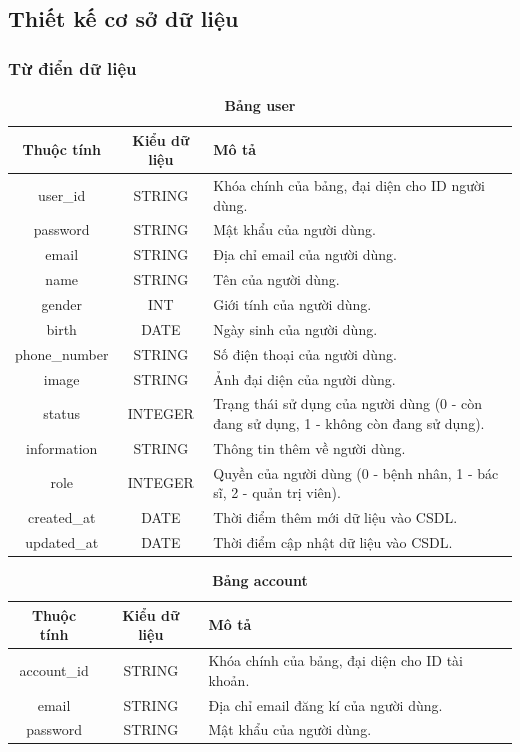 \subsection{Thiết kế cơ sở dữ liệu}
\label{design_database}

\subsubsection{Từ điển dữ liệu}

\begin{table}[H]
  \caption{\bfseries \fontsize{12pt}{0pt}\selectfont Bảng user}
  \centering
  \begin{tabularx}{0.9\textwidth}{|c|c|X|}
    \hline
    \textbf{Thuộc tính} & \textbf{Kiểu dữ liệu} & \textbf{Mô tả} \\
    \hline
    user\_id & STRING & Khóa chính của bảng, đại diện cho ID người dùng. \\
    \hline
    password & STRING & Mật khẩu của người dùng. \\
    \hline
    email & STRING & Địa chỉ email của người dùng. \\
    \hline
    name & STRING & Tên của người dùng. \\
    \hline
    gender & INT & Giới tính của người dùng. \\
    \hline
    birth & DATE & Ngày sinh của người dùng. \\
    \hline
    phone\_number & STRING & Số điện thoại của người dùng. \\
    \hline
    image & STRING & Ảnh đại diện của người dùng. \\
    \hline
    status & INTEGER & Trạng thái sử dụng của người dùng (0 - còn đang sử dụng, 1 - không còn đang sử dụng). \\
    \hline
    information & STRING & Thông tin thêm về người dùng. \\
    \hline
    role & INTEGER & Quyền của người dùng (0 - bệnh nhân, 1 - bác sĩ, 2 - quản trị viên). \\
    \hline
    created\_at & DATE & Thời điểm thêm mới dữ liệu vào CSDL. \\
    \hline
    updated\_at & DATE & Thời điểm cập nhật dữ liệu vào CSDL. \\
    \hline
    
  \end{tabularx}
\end{table}


\begin{table}[H]
  \caption{\bfseries \fontsize{12pt}{0pt}\selectfont Bảng account}
  \centering
  \begin{tabularx}{0.9\textwidth}{|c|c|X|}
    \hline
    \textbf{Thuộc tính} & \textbf{Kiểu dữ liệu} & \textbf{Mô tả} \\
    \hline
    account\_id & STRING & Khóa chính của bảng, đại diện cho ID tài khoản. \\
    \hline
    email & STRING & Địa chỉ email đăng kí của người dùng. \\
    \hline
    password & STRING & Mật khẩu của người dùng. \\
    \hline
  \end{tabularx}
\end{table}

